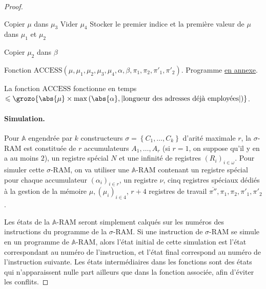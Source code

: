 \documentclass{report}
\newcommand{\bbA}{\mathbb{A}}
\begin{document}
\begin{proof}
\begin{algorithm}[H]
						\espace
						
						
						Copier $\mu$ dans $\mu_3$ \;
						Vider $\mu_4$ \;
						Stocker le premier indice et la première valeur de $\mu$ dans $\mu_1$ et $\mu_2$ \;
						
						\espace
						
						
						
						
						Copier $\mu_2$ dans $\beta$ \;
						
						\caption{Fonction $\text{ACCESS}\left( \mu, \mu_1, \mu_2, \mu_3, \mu_4, \alpha, \beta, \pi_1, \pi_2, \pi'_1, \pi'_2\right)$. Programme \hyperref[prog:A_RAM_fn_ACCESS]{en annexe}. }
					\end{algorithm}
					
					\espace

					La fonction $\text{ACCESS}$ fonctionne en temps $\leqslant \grozo{\abs{\mu} \times \max\left( \abs{\alpha} , \left| \text{longueur des adresses déjà employées} \right| \right) }$.
					
					\paragraph{Simulation.}
					\label{par:sim_sigma_RAM_A_RAM}
					Pour $\bbA$ engendrée par $k$ constructeurs $\sigma = \left\lbrace C_1, \dots, C_k\right\rbrace$ d'arité maximale $r$, la $\sigma$-RAM est constituée de $r$ accumulateurs $A_1, \dots, A_r$ (si $r = 1$, on suppose qu'il y en a au moins $2$), un registre spécial $N$ et une infinité de registres $(R_i)_{i \in \omega}$. Pour simuler cette $\sigma$-RAM, on va utiliser une $\bbA$-RAM contenant un registre spécial pour chaque accumulateur $(\alpha_i)_{i \in r}$, un registre $\nu$, cinq registres spéciaux dédiés à la gestion de la mémoire $\mu, (\mu_i)_{i \in 4}$, $r+4$ registres de travail $\overline{\pi''}, \pi_1, \pi_2, \pi'_1, \pi'_2$.
					
					Les états de la $\bbA$-RAM seront simplement calqués sur les numéros des instructions du programme de la $\sigma$-RAM. Si une instruction de $\sigma$-RAM se simule en un programme de $\bbA$-RAM, alors l'état initial de cette simulation est l'état correspondant au numéro de l'instruction, et l'état final correspond au numéro de l'instruction suivante. Les états intermédiaires dans les fonctions sont des états qui n'apparaissent nulle part ailleurs que dans la fonction associée, afin d'éviter les conflits. 
						

\end{proof}
\end{document}
